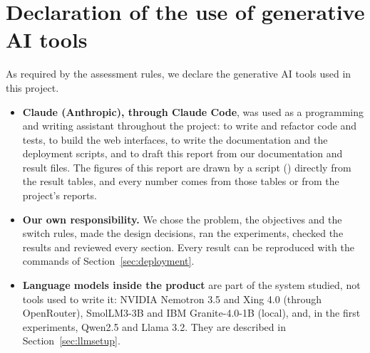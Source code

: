 \section{Declaration of the use of generative AI tools}
\label{sec:aiuse}

As required by the assessment rules, we declare the generative AI tools used in this project.

\begin{itemize}
  \item \textbf{Claude (Anthropic), through Claude Code}, was used as a programming and writing assistant
        throughout the project: to write and refactor code and tests, to build the web interfaces, to write the
        documentation and the deployment scripts, and to draft this report from our documentation and result
        files. The figures of this report are drawn by a script () directly from
        the result tables, and every number comes from those tables or from the project's reports.
  \item \textbf{Our own responsibility.} We chose the problem, the objectives and the switch rules, made the
        design decisions, ran the experiments, checked the results and reviewed every section. Every result can
        be reproduced with the commands of Section~\ref{sec:deployment}.
  \item \textbf{Language models inside the product} are part of the system studied, not tools used to write it:
        NVIDIA Nemotron 3.5 and Xing 4.0 (through OpenRouter), SmolLM3-3B and IBM Granite-4.0-1B (local), and,
        in the first experiments, Qwen2.5 and Llama 3.2. They are described in Section~\ref{sec:llmsetup}.
\end{itemize}
